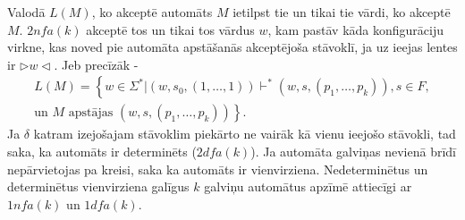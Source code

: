 \documentclass{ludis}
\begin{document}
Valodā $L(M)$, ko akceptē automāts $M$ ietilpst tie un tikai tie vārdi, ko akceptē $M$. $2nfa(k)$ akceptē tos un tikai tos vārdus $w$, kam pastāv kāda konfigurāciju virkne, kas noved pie automāta apstāšanās akceptējoša stāvoklī, ja uz ieejas lentes ir
$\triangleright w \triangleleft$. Jeb precīzāk - 
\begin{multline*}
	L(M)=\left\{ w \in \Sigma^* | \left(w,s_0,\left(1,\ldots,1\right)\right) \vdash^* \left(w,s,\left(p_1,\ldots,p_k\right)\right), s \in F,\right.\\
	\left.\textrm{un } M \textrm{ apstājas } \left(w,s,\left(p_1,\ldots,p_k\right)\right)\right\}.
\end{multline*}
Ja $\delta$ katram izejošajam stāvoklim piekārto ne vairāk kā vienu ieejošo stāvokli, tad saka, ka automāts ir determinēts ($2dfa(k)$). Ja automāta galviņas nevienā brīdī nepārvietojas pa kreisi, saka ka automāts ir vienvirziena. Nedeterminētus un determinētus vienvirziena galīgus $k$ galviņu automātus apzīmē attiecīgi ar $1nfa(k)$ un $1dfa(k)$.
\end{document}
